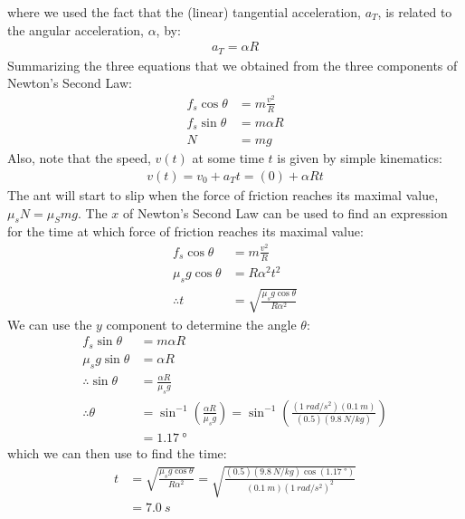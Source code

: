 \begin{example}
where we used the fact that the (linear) tangential acceleration, $a_T$, is related to the angular acceleration, $\alpha$, by:
\begin{align*}
a_T = \alpha R
\end{align*}
Summarizing the three equations that we obtained from the three components of Newton's Second Law:
\begin{align*}
f_s\cos\theta &= m\frac{v^2}{R}\\
f_s\sin\theta &= m\alpha R\\
N&=mg
\end{align*}
Also, note that the speed, $v(t)$ at some time $t$ is given by simple kinematics:
\begin{align*}
v(t)=v_0+a_Tt=(0)+\alpha R t
\end{align*}
The ant will start to slip when the force of friction reaches its maximal value, $\mu_sN=\mu_Smg$. The $x$ of Newton's Second Law can be used to find an expression for the time at which force of friction reaches its maximal value:
\begin{align*}
f_s\cos\theta &= m\frac{v^2}{R}\\
\mu_sg\cos\theta &= R\alpha^2t^2\\
\therefore t &= \sqrt{\frac{\mu_sg\cos\theta}{R\alpha^2}}
\end{align*}
We can use the $y$ component to determine the angle $\theta$:
\begin{align*}
f_s\sin\theta &= m\alpha R\\
\mu_sg\sin\theta &= \alpha R\\
\therefore \sin\theta &= \frac{\alpha R}{\mu_s g}\\
\therefore \theta &= \sin^{-1}\left( \frac{\alpha R}{\mu_s g}  \right)=\sin^{-1}\left( \frac{(\SI{1}{rad/s^2})(\SI{0.1}{m})}{(0.5)(\SI{9.8}{N/kg})}  \right)\\
&=\SI{1.17}{\degree}
\end{align*}
which we can then use to find the time:
\begin{align*}
t &= \sqrt{\frac{\mu_sg\cos\theta}{R\alpha^2}}= \sqrt{\frac{(0.5)(\SI{9.8}{N/kg})\cos(\SI{1.17}{\degree})}{(\SI{0.1}{m})(\SI{1}{rad/s^2})^2}}\\
&=\SI{7.0}{s}
\end{align*}
\end{example}



\newpage
